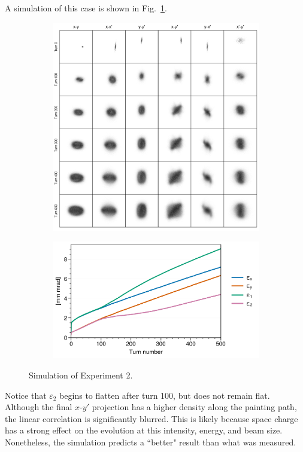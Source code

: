 A simulation of this case is shown in Fig.~\ref{fig:exp2_sim}.
%
\begin{figure}[!p]
    \centering
    \begin{subfigure}{0.85\textwidth}
        \includegraphics[width=\textwidth]{Images/chapter5/exp2/sim_snapshots.png}
    \end{subfigure}
    \vfill
    \vspace*{1.0cm}
    \vfill
    \begin{subfigure}{0.7\textwidth}
        \includegraphics[width=\textwidth]{Images/chapter5/exp2/sim_emittances.png}
    \end{subfigure}
    \caption{Simulation of Experiment 2.}
    \label{fig:exp2_sim}
\end{figure}
%
Notice that $\varepsilon_2$ begins to flatten after turn 100, but does not remain flat. Although the final $x$-$y'$ projection has a higher density along the painting path, the linear correlation is significantly blurred. This is likely because space charge has a strong effect on the evolution at this intensity, energy, and beam size. Nonetheless, the simulation predicts a ``better" result than what was measured.



